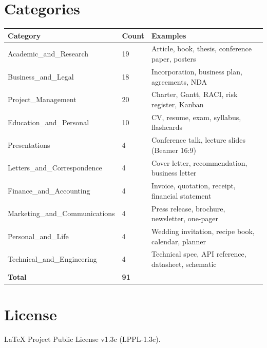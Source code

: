 \documentclass[11pt,a4paper]{article}
\begin{document}
\section{Categories}
\label{sec:categories}

\begin{table}[h]
\centering
\begin{tabularx}{\textwidth}{L{5cm} C{2cm} X}
\toprule
\textbf{Category} & \textbf{Count} & \textbf{Examples} \\
\midrule
Academic\_and\_Research & 19 & Article, book, thesis, conference paper, posters \\
Business\_and\_Legal & 18 & Incorporation, business plan, agreements, NDA \\
Project\_Management & 20 & Charter, Gantt, RACI, risk register, Kanban \\
Education\_and\_Personal & 10 & CV, resume, exam, syllabus, flashcards \\
Presentations & 4 & Conference talk, lecture slides (Beamer 16:9) \\
Letters\_and\_Correspondence & 4 & Cover letter, recommendation, business letter \\
Finance\_and\_Accounting & 4 & Invoice, quotation, receipt, financial statement \\
Marketing\_and\_Communications & 4 & Press release, brochure, newsletter, one-pager \\
Personal\_and\_Life & 4 & Wedding invitation, recipe book, calendar, planner \\
Technical\_and\_Engineering & 4 & Technical spec, API reference, datasheet, schematic \\
\midrule
\textbf{Total} & \textbf{91} & \\
\bottomrule
\end{tabularx}
\end{table}

\section{License}
\label{sec:license}

LaTeX Project Public License v1.3c (LPPL-1.3c).
\end{document}
